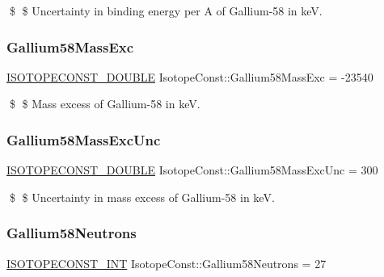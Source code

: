 \$ \$ Uncertainty in binding energy per A of Gallium-\/58 in keV. \mbox{\label{group___isotope_const-_gallium-_ga58_ga05578eff3dc171243620420786c773a3}} 
\subsubsection{\texorpdfstring{Gallium58\+Mass\+Exc}{Gallium58MassExc}}
{\footnotesize\ttfamily \mbox{\hyperlink{group___isotope_const-_macros_ga8f45a7272ce02c0b4c65c44636ed719a}{I\+S\+O\+T\+O\+P\+E\+C\+O\+N\+S\+T\+\_\+\+D\+O\+U\+B\+LE}} Isotope\+Const\+::\+Gallium58\+Mass\+Exc = -\/23540}

\$ \$ Mass excess of Gallium-\/58 in keV. \mbox{\label{group___isotope_const-_gallium-_ga58_gac88f62b50a6cbc84902887b2bbdccfe8}} 
\subsubsection{\texorpdfstring{Gallium58\+Mass\+Exc\+Unc}{Gallium58MassExcUnc}}
{\footnotesize\ttfamily \mbox{\hyperlink{group___isotope_const-_macros_ga8f45a7272ce02c0b4c65c44636ed719a}{I\+S\+O\+T\+O\+P\+E\+C\+O\+N\+S\+T\+\_\+\+D\+O\+U\+B\+LE}} Isotope\+Const\+::\+Gallium58\+Mass\+Exc\+Unc = 300}

\$ \$ Uncertainty in mass excess of Gallium-\/58 in keV. \mbox{\label{group___isotope_const-_gallium-_ga58_gaa1ebe4967d7e0900cf76ad3745448bbf}} 
\subsubsection{\texorpdfstring{Gallium58\+Neutrons}{Gallium58Neutrons}}
{\footnotesize\ttfamily \mbox{\hyperlink{group___isotope_const-_macros_ga5f18360b3e99483a35c32d789e62621c}{I\+S\+O\+T\+O\+P\+E\+C\+O\+N\+S\+T\+\_\+\+I\+NT}} Isotope\+Const\+::\+Gallium58\+Neutrons = 27}

